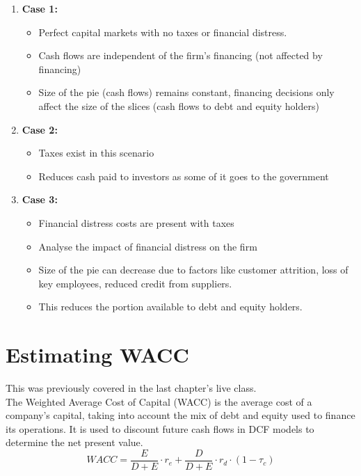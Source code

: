 \begin{enumerate}
    \item \textbf{Case 1:}
    \begin{itemize}
        \item Perfect capital markets with no taxes or financial distress.
        \item Cash flows are independent of the firm's financing (not affected by financing)
        \item Size of the pie (cash flows) remains constant, financing decisions only affect the size of the slices (cash flows to debt and equity holders)
    \end{itemize}
    \item \textbf{Case 2:}
    \begin{itemize}
        \item Taxes exist in this scenario
        \item Reduces cash paid to investors as some of it goes to the government
    \end{itemize}
    \item \textbf{Case 3:}
    \begin{itemize}
        \item Financial distress costs are present with taxes
        \item Analyse the impact of financial distress on the firm
        \item Size of the pie can decrease due to factors like customer attrition, loss of key employees, reduced credit from suppliers.
        \item This reduces the portion available to debt and equity holders.
    \end{itemize}
\end{enumerate}


\section{Estimating WACC}
This was previously covered in the last chapter's live class.\\

The Weighted Average Cost of Capital (WACC) is the average cost of a company's capital, taking into account the mix of debt and equity used to finance its operations. It is used to discount future cash flows in DCF models to determine the net present value.\\

\begin{equation}
    WACC = \frac{E}{D+E} \cdot r_e + \frac{D}{D+E} \cdot r_d \cdot (1 - \tau_c)
\end{equation}

